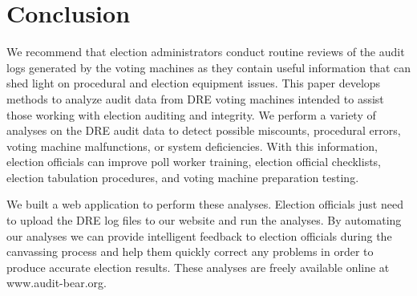 \section{Conclusion}
We recommend that election administrators conduct routine reviews of the audit logs generated by the voting machines as they contain useful information that can shed light on procedural and election equipment issues. This paper develops methods to analyze audit data from DRE voting machines intended to assist those working with election auditing and integrity.   We perform a variety of analyses on the DRE audit data to detect possible miscounts, procedural errors, voting machine malfunctions, or system deficiencies. With this information, election officials can improve poll worker training, election official checklists, election tabulation procedures, and voting machine preparation testing.

We built a web application to perform these analyses. Election officials just need to upload the DRE log files to our website and run the analyses. By automating our analyses we can provide intelligent feedback to election officials during the canvassing process and help them quickly correct any problems in order to produce accurate election results. These analyses are freely available online at www.audit-bear.org.
